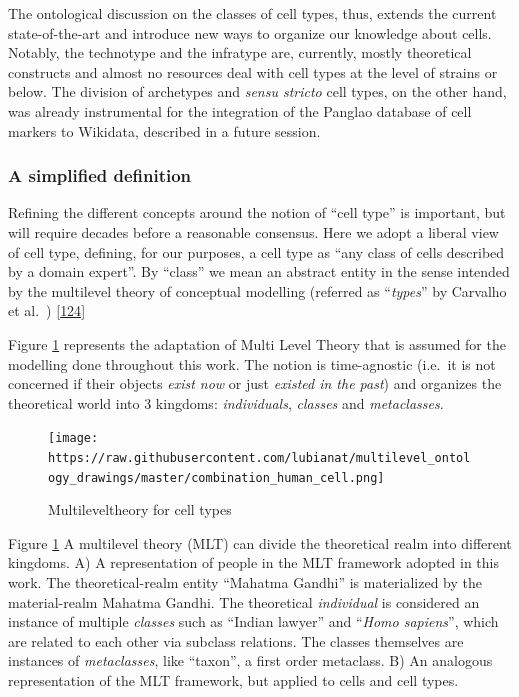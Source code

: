 The ontological discussion on the classes of cell types, thus, extends the current state-of-the-art and introduce new ways to organize our knowledge about cells.
Notably, the technotype and the infratype are, currently, mostly theoretical constructs and almost no resources deal with cell types at the level of strains or below.
The division of archetypes and \emph{sensu stricto} cell types, on the other hand, was already instrumental for the integration of the Panglao database of cell markers to Wikidata, described in a future session.

\hypertarget{a-simplified-definition}{%
\subsubsection{A simplified definition}\label{a-simplified-definition}}

Refining the different concepts around the notion of ``cell type'' is important, but will require decades before a reasonable consensus.
Here we adopt a liberal view of cell type, defining, for our purposes, a cell type as ``any class of cells described by a domain expert''.
By ``class'' we mean an abstract entity in the sense intended by the multilevel theory of conceptual modelling (referred as ``\emph{types}'' by Carvalho et al.~) {[}\protect\hyperlink{ref-eP47FILn}{124}{]}

Figure \ref{fig:multilevel} represents the adaptation of Multi Level Theory that is assumed for the modelling done throughout this work.
The notion is time-agnostic (i.e.~it is not concerned if their objects \emph{exist now} or just \emph{existed in the past}) and organizes the theoretical world into 3 kingdoms: \emph{individuals}, \emph{classes} and \emph{metaclasses}.

\begin{figure}
\hypertarget{fig:multilevel}{%
\centering
\texttt{[image: https://raw.githubusercontent.com/lubianat/multilevel\_ontology\_drawings/master/combination\_human\_cell.png]}
\caption{Multileveltheory for cell types}\label{fig:multilevel}
}
\end{figure}

Figure \ref{fig:multilevel} A multilevel theory (MLT) can divide the theoretical realm into different kingdoms. A) A representation of people in the MLT framework adopted in this work. The theoretical-realm entity ``Mahatma Gandhi'' is materialized by the material-realm Mahatma Gandhi. The theoretical \emph{individual} is considered an instance of multiple \emph{classes} such as ``Indian lawyer'' and ``\emph{Homo sapiens}'', which are related to each other via subclass relations. The classes themselves are instances of \emph{metaclasses}, like ``taxon'', a first order metaclass. B) An analogous representation of the MLT framework, but applied to cells and cell types.


